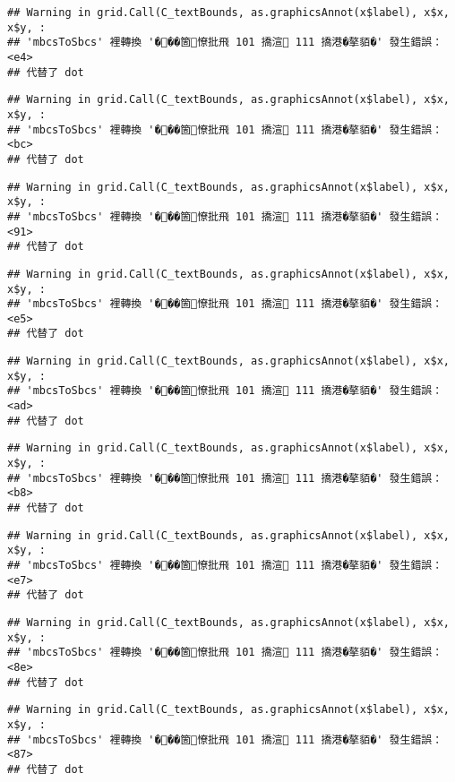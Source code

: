 \documentclass[
]{article}
\begin{document}
\begin{verbatim}
## Warning in grid.Call(C_textBounds, as.graphicsAnnot(x$label), x$x, x$y, :
## 'mbcsToSbcs' 裡轉換 '���箇憭批飛 101 撟渲 111 撟港�摮貊�' 發生錯誤：<e4>
## 代替了 dot
\end{verbatim}

\begin{verbatim}
## Warning in grid.Call(C_textBounds, as.graphicsAnnot(x$label), x$x, x$y, :
## 'mbcsToSbcs' 裡轉換 '���箇憭批飛 101 撟渲 111 撟港�摮貊�' 發生錯誤：<bc>
## 代替了 dot
\end{verbatim}

\begin{verbatim}
## Warning in grid.Call(C_textBounds, as.graphicsAnnot(x$label), x$x, x$y, :
## 'mbcsToSbcs' 裡轉換 '���箇憭批飛 101 撟渲 111 撟港�摮貊�' 發生錯誤：<91>
## 代替了 dot
\end{verbatim}

\begin{verbatim}
## Warning in grid.Call(C_textBounds, as.graphicsAnnot(x$label), x$x, x$y, :
## 'mbcsToSbcs' 裡轉換 '���箇憭批飛 101 撟渲 111 撟港�摮貊�' 發生錯誤：<e5>
## 代替了 dot
\end{verbatim}

\begin{verbatim}
## Warning in grid.Call(C_textBounds, as.graphicsAnnot(x$label), x$x, x$y, :
## 'mbcsToSbcs' 裡轉換 '���箇憭批飛 101 撟渲 111 撟港�摮貊�' 發生錯誤：<ad>
## 代替了 dot
\end{verbatim}

\begin{verbatim}
## Warning in grid.Call(C_textBounds, as.graphicsAnnot(x$label), x$x, x$y, :
## 'mbcsToSbcs' 裡轉換 '���箇憭批飛 101 撟渲 111 撟港�摮貊�' 發生錯誤：<b8>
## 代替了 dot
\end{verbatim}

\begin{verbatim}
## Warning in grid.Call(C_textBounds, as.graphicsAnnot(x$label), x$x, x$y, :
## 'mbcsToSbcs' 裡轉換 '���箇憭批飛 101 撟渲 111 撟港�摮貊�' 發生錯誤：<e7>
## 代替了 dot
\end{verbatim}

\begin{verbatim}
## Warning in grid.Call(C_textBounds, as.graphicsAnnot(x$label), x$x, x$y, :
## 'mbcsToSbcs' 裡轉換 '���箇憭批飛 101 撟渲 111 撟港�摮貊�' 發生錯誤：<8e>
## 代替了 dot
\end{verbatim}

\begin{verbatim}
## Warning in grid.Call(C_textBounds, as.graphicsAnnot(x$label), x$x, x$y, :
## 'mbcsToSbcs' 裡轉換 '���箇憭批飛 101 撟渲 111 撟港�摮貊�' 發生錯誤：<87>
## 代替了 dot
\end{verbatim}
\end{document}
